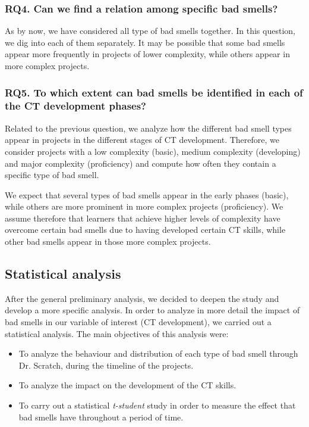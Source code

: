 \subsubsection{RQ4. Can we find a relation among specific bad smells?}
\label{subsubsec:RQ4}

As by now, we have considered all type of bad smells together. In this question, we dig into each of them separately. It may be possible that some bad smells appear more frequently in projects of lower complexity, while others appear in more complex projects.

\subsubsection{RQ5. To which extent can bad smells be identified in each of the CT development phases?}
\label{subsubsec:RQ5}

Related to the previous question, we analyze how the different bad smell types appear in projects in the different stages of CT development. Therefore, we consider projects with a low complexity (basic), medium complexity (developing) and major complexity (proficiency) and compute how often they contain a specific type of bad smell.

We expect that several types of bad smells appear in the early phases (basic), while others are more prominent in more complex projects (proficiency). We assume therefore that learners that achieve higher levels of complexity have overcome certain bad smells due to having developed certain CT skills, while other bad smells appear in those more complex projects.


\subsection{Statistical analysis}
\label{subsec:statisticalanalysis}

After the general preliminary analysis, we decided to deepen the study and develop a more specific analysis. In order to analyze in more detail the impact of bad smells in our variable of interest (CT development), we carried out a statistical analysis. The main objectives of this analysis were: 

\begin{itemize}
    \item To analyze the behaviour and distribution of each type of bad smell through Dr. Scratch, during the timeline of the projects.
    \item To analyze the impact on the development of the CT skills.
    \item To carry out a statistical \textit{t-student} study in order to measure the effect that bad smells have throughout a period of time. 
\end{itemize}

